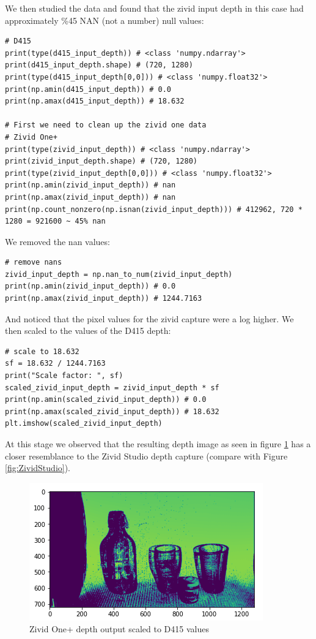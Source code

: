 We then studied the data and found that the zivid input depth in this case had approximately \%45 NAN (not a number) null values:
\begin{verbatim}
# D415
print(type(d415_input_depth)) # <class 'numpy.ndarray'>
print(d415_input_depth.shape) # (720, 1280)
print(type(d415_input_depth[0,0])) # <class 'numpy.float32'>
print(np.amin(d415_input_depth)) # 0.0
print(np.amax(d415_input_depth)) # 18.632

# First we need to clean up the zivid one data
# Zivid One+
print(type(zivid_input_depth)) # <class 'numpy.ndarray'>
print(zivid_input_depth.shape) # (720, 1280)
print(type(zivid_input_depth[0,0])) # <class 'numpy.float32'>
print(np.amin(zivid_input_depth)) # nan
print(np.amax(zivid_input_depth)) # nan
print(np.count_nonzero(np.isnan(zivid_input_depth))) # 412962, 720 * 1280 = 921600 ~ 45% nan    
\end{verbatim}
We removed the nan values:
\begin{verbatim}
# remove nans
zivid_input_depth = np.nan_to_num(zivid_input_depth)
print(np.amin(zivid_input_depth)) # 0.0
print(np.amax(zivid_input_depth)) # 1244.7163
\end{verbatim}
And noticed that the pixel values for the zivid capture were a log higher.
We then scaled to the values of the D415 depth:
\begin{verbatim}
# scale to 18.632
sf = 18.632 / 1244.7163
print("Scale factor: ", sf)
scaled_zivid_input_depth = zivid_input_depth * sf
print(np.amin(scaled_zivid_input_depth)) # 0.0
print(np.amax(scaled_zivid_input_depth)) # 18.632
plt.imshow(scaled_zivid_input_depth)    
\end{verbatim}
At this stage we observed that the resulting depth image as seen in figure \ref{fig:Scaled-Zivid-Depth} has a closer resemblance to the Zivid Studio depth capture (compare with Figure \ref{fig:ZividStudio}).

\begin{figure}[h!]
\centering
\includegraphics[width=\textwidth]{Figures/Scaled-Zivid-Depth.png}
\caption{Zivid One+ depth output scaled to D415 values}
\label{fig:Scaled-Zivid-Depth}
\end{figure}

